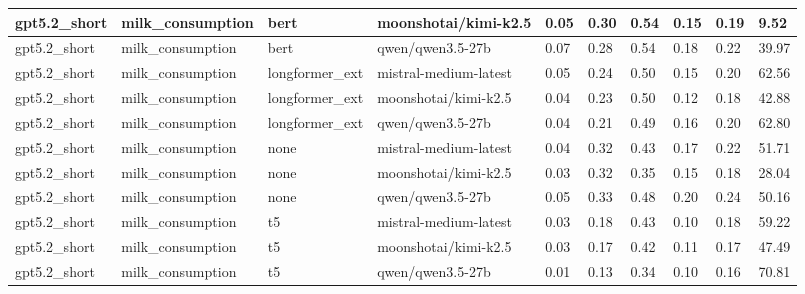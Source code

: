 \begin{tabular}{|l|l|l|l|l|l|l|l|l|l|}
 \hline
 gpt5.2\_short & milk\_consumption & bert & moonshotai/kimi-k2.5 & 0.05 & 0.30 & 0.54 & 0.15 & 0.19 & 9.52 \\
 \hline
 gpt5.2\_short & milk\_consumption & bert & qwen/qwen3.5-27b & 0.07 & 0.28 & 0.54 & 0.18 & 0.22 & 39.97 \\
 \hline
 gpt5.2\_short & milk\_consumption & longformer\_ext & mistral-medium-latest & 0.05 & 0.24 & 0.50 & 0.15 & 0.20 & 62.56 \\
 \hline
 gpt5.2\_short & milk\_consumption & longformer\_ext & moonshotai/kimi-k2.5 & 0.04 & 0.23 & 0.50 & 0.12 & 0.18 & 42.88 \\
 \hline
 gpt5.2\_short & milk\_consumption & longformer\_ext & qwen/qwen3.5-27b & 0.04 & 0.21 & 0.49 & 0.16 & 0.20 & 62.80 \\
 \hline
 gpt5.2\_short & milk\_consumption & none & mistral-medium-latest & 0.04 & 0.32 & 0.43 & 0.17 & 0.22 & 51.71 \\
 \hline
 gpt5.2\_short & milk\_consumption & none & moonshotai/kimi-k2.5 & 0.03 & 0.32 & 0.35 & 0.15 & 0.18 & 28.04 \\
 \hline
 gpt5.2\_short & milk\_consumption & none & qwen/qwen3.5-27b & 0.05 & 0.33 & 0.48 & 0.20 & 0.24 & 50.16 \\
 \hline
 gpt5.2\_short & milk\_consumption & t5 & mistral-medium-latest & 0.03 & 0.18 & 0.43 & 0.10 & 0.18 & 59.22 \\
 \hline
 gpt5.2\_short & milk\_consumption & t5 & moonshotai/kimi-k2.5 & 0.03 & 0.17 & 0.42 & 0.11 & 0.17 & 47.49 \\
 \hline
 gpt5.2\_short & milk\_consumption & t5 & qwen/qwen3.5-27b & 0.01 & 0.13 & 0.34 & 0.10 & 0.16 & 70.81 \\
\hline
\end{tabular}
